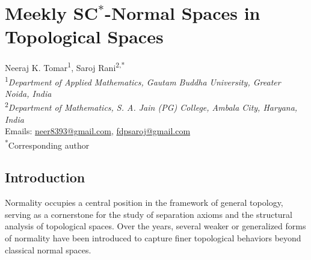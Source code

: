\documentclass[12pt,a4paper,twoside]{report}  %
\theoremstyle{plain}
\theoremstyle{definition}
\begin{document}
\chapter*{Meekly \texorpdfstring{SC$^*$}{SC*}-Normal Spaces in Topological Spaces}

\begin{center}
{\large Neeraj K. Tomar\textsuperscript{1}, Saroj Rani\textsuperscript{2,*}} \\[6pt]
\textsuperscript{1}\textit{Department of Applied Mathematics, Gautam Buddha University, Greater Noida, India} \\ 
\textsuperscript{2}\textit{Department of Mathematics, S. A. Jain (PG) College, Ambala City, Haryana, India} \\ 
Emails: \href{mailto:neer8393@gmail.com}{neer8393@gmail.com}, 
\href{mailto:fdpsaroj@gmail.com}{fdpsaroj@gmail.com} \\[2pt]
\textsuperscript{*}Corresponding author
\end{center}

\begin{abstract}
This chapter develops the concept of \textbf{meekly $SC^*$-normality}, a novel generalization of the classical notion of normality in topology. 
The proposed framework simultaneously broadens $SC^*$-normality and other established forms of normality, offering a unified perspective on 
generalized separation axioms. Fundamental properties are systematically derived, several equivalent characterizations are obtained, 
and the relationships between meekly $SC^*$-normal spaces and a range of existing normal-type spaces are rigorously analyzed. 
By establishing these structural connections, the chapter not only enriches the theory of generalized closed sets and separation axioms 
but also opens new directions for further research in advanced topological studies.
\end{abstract}




\section{Introduction}

Normality occupies a central position in the framework of general topology, 
serving as a cornerstone for the study of separation axioms and the structural 
analysis of topological spaces. Over the years, several weaker or generalized 
forms of normality have been introduced to capture finer topological behaviors 
beyond classical normal spaces.
\end{document}
